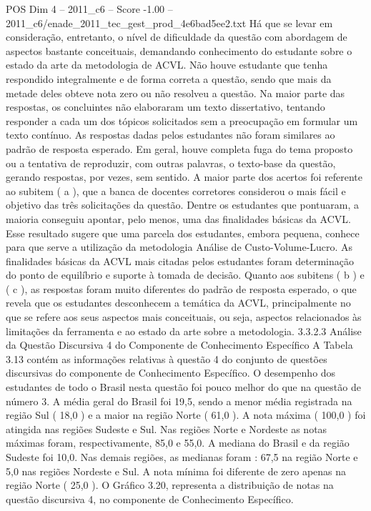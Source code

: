 \begin{textsample}{POS Dim 4 – 2011\_c6 – Score -1.00 – 2011\_c6/enade\_2011\_tec\_gest\_prod\_4e6bad5ee2.txt}
Há que se levar em consideração, entretanto, o nível de dificuldade da questão com abordagem de aspectos bastante conceituais, demandando conhecimento do estudante sobre o estado da arte da metodologia de ACVL.
Não houve estudante que tenha respondido integralmente e de forma correta a questão, sendo que mais da metade deles obteve nota zero ou não resolveu a questão.
Na maior parte das respostas, os concluintes não elaboraram um texto dissertativo, tentando responder a cada um dos tópicos solicitados sem a preocupação em formular um texto contínuo.
As respostas dadas pelos estudantes não foram similares ao padrão de resposta esperado.
Em geral, houve completa fuga do tema proposto ou a tentativa de reproduzir, com outras palavras, o texto-base da questão, gerando respostas, por vezes, sem sentido.
A maior parte dos acertos foi referente ao subitem ( a ), que a banca de docentes corretores considerou o mais fácil e objetivo das três solicitações da questão.
Dentre os estudantes que pontuaram, a maioria conseguiu apontar, pelo menos, uma das finalidades básicas da ACVL.
Esse resultado sugere que uma parcela dos estudantes, embora pequena, conhece para que serve a utilização da metodologia Análise de Custo-Volume-Lucro.
As finalidades básicas da ACVL mais citadas pelos estudantes foram determinação do ponto de equilíbrio e suporte à tomada de decisão.
Quanto aos subitens ( b ) e ( c ), as respostas foram muito diferentes do padrão de resposta esperado, o que revela que os estudantes desconhecem a temática da ACVL, principalmente no que se refere aos seus aspectos mais conceituais, ou seja, aspectos relacionados às limitações da ferramenta e ao estado da arte sobre a metodologia. 3.3.2.3 Análise da Questão Discursiva 4 do Componente de Conhecimento Específico A Tabela 3.13 contém as informações relativas à questão 4 do conjunto de questões discursivas do componente de Conhecimento Específico.
O desempenho dos estudantes de todo o Brasil nesta questão foi pouco melhor do que na questão de número 3.
A média geral do Brasil foi 19,5, sendo a menor média registrada na região Sul ( 18,0 ) e a maior na região Norte ( 61,0 ).
A nota máxima ( 100,0 ) foi atingida nas regiões Sudeste e Sul.
Nas regiões Norte e Nordeste as notas máximas foram, respectivamente, 85,0 e 55,0.
A mediana do Brasil e da região Sudeste foi 10,0.
Nas demais regiões, as medianas foram : 67,5 na região Norte e 5,0 nas regiões Nordeste e Sul.
A nota mínima foi diferente de zero apenas na região Norte ( 25,0 ).
O Gráfico 3.20, representa a distribuição de notas na questão discursiva 4, no componente de Conhecimento Específico.

\end{textsample}
